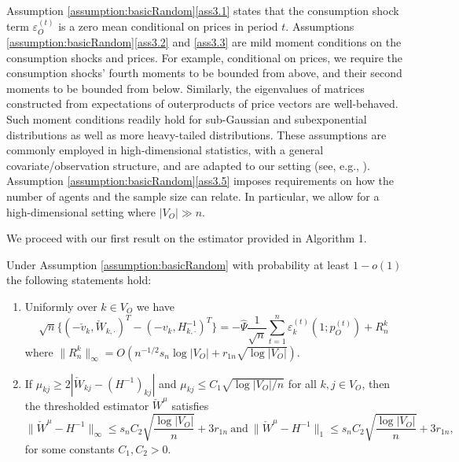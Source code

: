 \documentclass[opre,nonblindrev]{informs3} %
\begin{document}
{Assumption \ref{assumption:basicRandom}\ref{ass3.1}
	states that the consumption shock term $\varepsilon_O^{(t)}$ is a zero mean conditional on prices in period $t$.
	Assumptions \ref{assumption:basicRandom}\ref{ass3.2} and \ref{ass3.3} are mild moment conditions on the consumption shocks and prices. For example, conditional on prices,  we require the 	consumption shocks'  fourth moments to be bounded from above,
and  their second moments to be bounded from below.
	Similarly, the eigenvalues
	of matrices constructed from
	expectations of outerproducts of price vectors are well-behaved.
	Such moment conditions readily hold for sub-Gaussian and subexponential distributions as well as more heavy-tailed distributions. These assumptions are commonly employed  in high-dimensional statistics, with a general covariate/observation structure, and are adapted to our setting (see, e.g., \cite{BickelRitovTsybakov2009,belloni2017pivotal,belloni2017simultaneous}).
	Assumption \ref{assumption:basicRandom}\ref{ass3.5} imposes requirements on how the number of agents and the sample size can relate. In particular, we allow for a high-dimensional setting where $|V_O| \gg n$.}


	We proceed with our first result on the estimator provided in Algorithm 1.

  \begin{theorem}\label{thm:OrthoHinv}
  	Under  Assumption \ref{assumption:basicRandom}
	with probability at least $1-o(1)$  the following statements hold:
\begin{enumerate}[label=\roman*.]
	\item 
Uniformly over  	$k\in V_O$ we have
\[
	\sqrt{n}\{ (-\check v_k, \check W_{k,\cdot})^T - (-v_k, H^{-1}_{k,\cdot})^T\} =  -
	 \hat \Psi\frac{1}{\sqrt{n}}\sum_{t=1}^n \varepsilon_{k}^{(t)}(1;{p}_O^{(t)})  +
R^k_n
\]
 where $\|R^k_n\|_\infty = O(n^{-1/2}s_n\log |V_O| + r_{1n}\sqrt{\log |V_O|})$.
\label{thm1_1}
 

	\item 
	If $\mu_{kj} \geq 2 |\check W_{kj} - (H^{-1})_{kj} |$ and $\mu_{kj}\leq C_1 \sqrt{\log|V_O|/n}$ for all $k,j \in V_O$, then the thresholded estimator
	$\check W^\mu $ satisfies
	\[\| \check W^\mu-H^{-1}\|_\infty  \leq s_n C_2 \sqrt{\frac{ \log |V_O|}{n} } + 3r_{1n} \ \mbox{and} \
	\|
	\check W^\mu-H^{-1}
	\|_1 \leq
	s_n C_2 \sqrt{\frac{ \log |V_O|}{n}  } + 3r_{1n},\]
	for some constants $C_1,C_2 >0$.
\label{thm1_2}

\end{enumerate}


  	

  \end{theorem}
\end{document}
